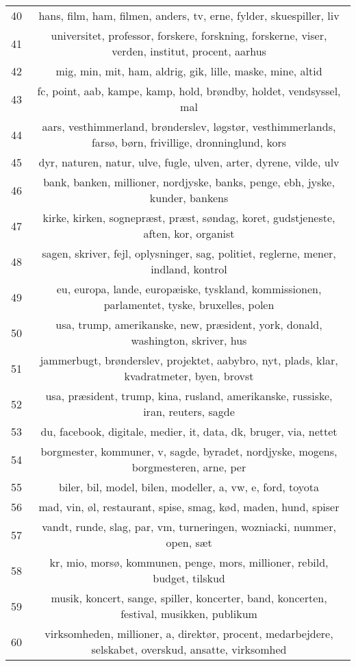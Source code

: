 \begin{longtable}[c]{c | c}
		40 & hans, film, ham, filmen, anders, tv, erne, fylder, skuespiller, liv \\
		41 & universitet, professor, forskere, forskning, forskerne, viser, verden, institut, procent, aarhus \\
		42 & mig, min, mit, ham, aldrig, gik, lille, maske, mine, altid \\
		43 & fc, point, aab, kampe, kamp, hold, brøndby, holdet, vendsyssel, mal \\
		44 & aars, vesthimmerland, brønderslev, løgstør, vesthimmerlands, farsø, børn, frivillige, dronninglund, kors \\
		45 & dyr, naturen, natur, ulve, fugle, ulven, arter, dyrene, vilde, ulv \\
		46 & bank, banken, millioner, nordjyske, banks, penge, ebh, jyske, kunder, bankens \\
		47 & kirke, kirken, sognepræst, præst, søndag, koret, gudstjeneste, aften, kor, organist \\
		48 & sagen, skriver, fejl, oplysninger, sag, politiet, reglerne, mener, indland, kontrol \\
		49 & eu, europa, lande, europæiske, tyskland, kommissionen, parlamentet, tyske, bruxelles, polen \\
		50 & usa, trump, amerikanske, new, præsident, york, donald, washington, skriver, hus \\
		51 & jammerbugt, brønderslev, projektet, aabybro, nyt, plads, klar, kvadratmeter, byen, brovst \\
		52 & usa, præsident, trump, kina, rusland, amerikanske, russiske, iran, reuters, sagde \\
		53 & du, facebook, digitale, medier, it, data, dk, bruger, via, nettet \\
		54 & borgmester, kommuner, v, sagde, byradet, nordjyske, mogens, borgmesteren, arne, per \\
		55 & biler, bil, model, bilen, modeller, a, vw, e, ford, toyota \\
		56 & mad, vin, øl, restaurant, spise, smag, kød, maden, hund, spiser \\
		57 & vandt, runde, slag, par, vm, turneringen, wozniacki, nummer, open, sæt \\
		58 & kr, mio, morsø, kommunen, penge, mors, millioner, rebild, budget, tilskud \\
		59 & musik, koncert, sange, spiller, koncerter, band, koncerten, festival, musikken, publikum \\
		60 & virksomheden, millioner, a, direktør, procent, medarbejdere, selskabet, overskud, ansatte, virksomhed \\

\end{longtable}
